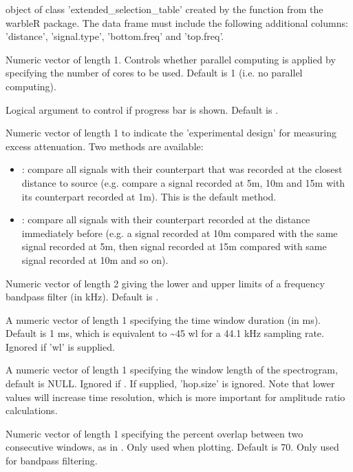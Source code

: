 \documentclass[letterpaper]{book}
\begin{document}
\begin{Arguments}
\begin{ldescription}
\item[\code{X}] object of class 'extended\_selection\_table' created by the function  from the warbleR package. The data frame must include the following additional columns: 'distance', 'signal.type', 'bottom.freq' and 'top.freq'.

\item[\code{parallel}] Numeric vector of length 1. Controls whether parallel computing is applied by specifying the number of cores to be used. Default is 1 (i.e. no parallel computing).

\item[\code{pb}] Logical argument to control if progress bar is shown. Default is .

\item[\code{method}] Numeric vector of length 1 to indicate the 'experimental design' for measuring excess attenuation. Two methods are available:
\begin{itemize}

\item{} : compare all signals with their counterpart that was recorded at the closest distance to source (e.g. compare a signal recorded at 5m, 10m and 15m with its counterpart recorded at 1m). This is the default method. 
\item{} : compare all signals with their counterpart recorded at the distance immediately before (e.g. a signal recorded at 10m compared with the same signal recorded at 5m, then signal recorded at 15m compared with same signal recorded at 10m and so on).

\end{itemize}


\item[\code{bp}] Numeric vector of length 2 giving the lower and upper limits of a frequency bandpass filter (in kHz). Default is .

\item[\code{hop.size}] A numeric vector of length 1 specifying the time window duration (in ms). Default is 1 ms, which is equivalent to \textasciitilde{}45 wl for a 44.1 kHz sampling rate. Ignored if 'wl' is supplied.

\item[\code{wl}] A numeric vector of length 1 specifying the window length of the spectrogram, default 
is NULL. Ignored if . If supplied, 'hop.size' is ignored.
Note that lower values will increase time resolution, which is more important for amplitude ratio calculations.

\item[\code{ovlp}] Numeric vector of length 1 specifying the percent overlap between two 
consecutive windows, as in . Only used when plotting. Default is 70. Only used for bandpass filtering.
\end{ldescription}
\end{Arguments}
\end{document}

